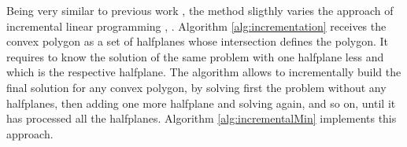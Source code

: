 \documentclass{article}
\begin{document}
Being very similar to previous work \cite{van2011reciprocal}, the method sligthly varies the approach of incremental linear programming \cite{seidel1991small}, \cite{van2008computational}.
Algorithm \ref{alg:incrementation} receives the convex polygon as a set of halfplanes whose intersection defines the polygon. It requires to know the solution of the same problem with one halfplane less and which is the respective halfplane. The algorithm allows to incrementally build the final solution for any convex polygon, by solving first the problem without any halfplanes, then adding one more halfplane and solving again, and so on, until it has processed all the halfplanes. Algorithm \ref{alg:incrementalMin} implements this approach.



\end{document}

